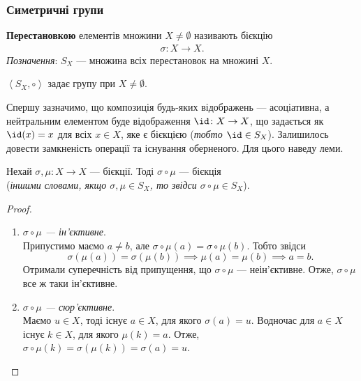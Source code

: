 \documentclass{math_library}
\begin{document}
\subsubsection{Симетричні групи}
\begin{definition}
\textbf{Перестановкою} елементів множини $X \neq \emptyset$ називають бієкцію 
\begin{align*}
\sigma \colon X \to X.
\end{align*}
\textit{Позначення}: $S_X$ --- множина всіх перестановок на множині $X$.
\end{definition}

\begin{theorem}
$\left< S_X, \circ \right>$ задає групу при $X \neq \emptyset$.
\end{theorem}

Спершу зазначимо, що композиція будь-яких відображень --- асоціативна, а нейтральним елементом буде відображення $\id \colon X \to X$, що задається як $\id(x) = x$ для всіх $x \in X$, яке є бієкцією (\textit{тобто $\id \in S_X$}). Залишилось довести замкненість операції та існування оберненого. Для цього наведу леми.

\begin{lemma}
Нехай $\sigma, \mu \colon X \to X$ --- бієкції. Тоді $\sigma \circ \mu$ --- бієкція \\
(\textit{іншими словами, якщо $\sigma, \mu \in S_X$, то звідси $\sigma \circ \mu \in S_X$}).
\end{lemma}

\begin{proof}
\begin{enumerate}[topsep=0pt,label={\Roman*.},wide=0pt]
\item \textit{$\sigma \circ \mu$ --- ін'єктивне}.\\
Припустимо маємо $a \neq b$, але $\sigma \circ \mu (a) = \sigma \circ \mu (b)$. Тобто звідси \[
\sigma (\mu(a)) = \sigma (\mu(b)) \implies \mu(a) = \mu(b) \implies a = b.
\]
Отримали суперечність від припущення, що $\sigma \circ \mu$ --- неін'єктивне. Отже, $\sigma \circ \mu$ все ж таки ін'єктивне.

\item \textit{$\sigma \circ \mu$ --- сюр'єктивне}.\\
Маємо $u \in X$, тоді існує $a \in X$, для якого $\sigma(a) = u$. Водночас для $a \in X$ існує $k \in X$, для якого $\mu(k) = a$. Отже, $\sigma \circ \mu (k) = \sigma(\mu(k)) = \sigma(a) = u$. \qedhere
\end{enumerate}
\end{proof}
\end{document}
